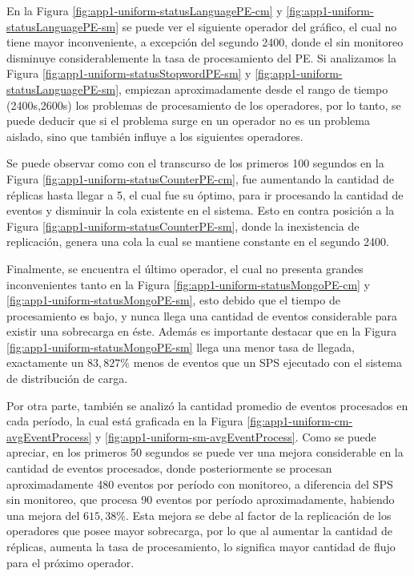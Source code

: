 En la Figura \ref{fig:app1-uniform-statusLanguagePE-cm} y \ref{fig:app1-uniform-statusLanguagePE-sm} se puede ver el siguiente operador del gráfico, el cual no tiene mayor inconveniente, a excepción del segundo 2400, donde el sin monitoreo disminuye considerablemente la tasa de procesamiento del PE. Si analizamos la Figura \ref{fig:app1-uniform-statusStopwordPE-sm} y \ref{fig:app1-uniform-statusLanguagePE-sm}, empiezan aproximadamente desde el rango de tiempo (2400s,2600s) los problemas de procesamiento de los operadores, por lo tanto, se puede deducir que si el problema surge en un operador no es un problema aislado, sino que también influye a los siguientes operadores.

Se puede observar como con el transcurso de los primeros 100 segundos en la Figura \ref{fig:app1-uniform-statusCounterPE-cm}, fue aumentando la cantidad de réplicas hasta llegar a 5, el cual fue su óptimo, para ir procesando la cantidad de eventos y disminuir la cola existente en el sistema. Esto en contra posición a la Figura \ref{fig:app1-uniform-statusCounterPE-sm}, donde la inexistencia de replicación, genera una cola la cual se mantiene constante en el segundo 2400. 

Finalmente, se encuentra el último operador, el cual no presenta grandes inconvenientes tanto en la Figura \ref{fig:app1-uniform-statusMongoPE-cm} y \ref{fig:app1-uniform-statusMongoPE-sm}, esto debido que el tiempo de procesamiento es bajo, y nunca llega una cantidad de eventos considerable para existir una sobrecarga en éste. Además es importante destacar que en la Figura \ref{fig:app1-uniform-statusMongoPE-sm} llega una menor tasa de llegada, exactamente un $83,827\%$ menos de eventos que un SPS ejecutado con el sistema de distribución de carga.

Por otra parte, también se analizó la cantidad promedio de eventos procesados en cada período, la cual está graficada en la Figura \ref{fig:app1-uniform-cm-avgEventProcess} y \ref{fig:app1-uniform-sm-avgEventProcess}. Como se puede apreciar, en los primeros 50 segundos se puede ver una mejora considerable en la cantidad de eventos procesados, donde posteriormente se procesan aproximadamente 480 eventos por período con monitoreo, a diferencia del SPS sin monitoreo, que procesa 90 eventos por período aproximadamente, habiendo una mejora del $615,38\%$. Esta mejora se debe al factor de la replicación de los operadores que posee mayor sobrecarga, por lo que al aumentar la cantidad de réplicas, aumenta la tasa de procesamiento, lo significa mayor cantidad de flujo para el próximo operador.

